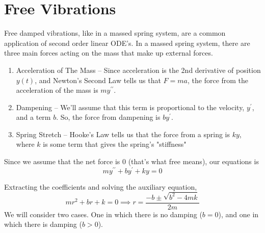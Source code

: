 \section{Free Vibrations}
\noindent
Free damped vibrations, like in a massed spring system, are a common application of second order linear ODE's. In a massed spring system, there are three main forces acting on the mass that make up external forces.
\begin{enumerate}[label=\arabic*)]
	\item Acceleration of The Mass -- Since acceleration is the 2nd derivative of position $y(t)$, and Newton's Second Law tells us that $F = ma$, the force from the acceleration of the mass is $my^{\prime\prime}$.
	\item Dampening -- We'll assume that this term is proportional to the velocity, $y^\prime$, and a term $b$. So, the force from dampening is $by^\prime$.
	\item Spring Stretch -- Hooke's Law tells us that the force from a spring is $ky$, where $k$ is some term that gives the spring's "stiffness"
\end{enumerate}
Since we assume that the net force is 0 (that's what free means), our equations is
\begin{equation*}
	my^{\prime\prime} + by^\prime + ky = 0
\end{equation*}

\noindent
Extracting the coefficients and solving the auxiliary equation,
\begin{equation*}
	mr^2 + br + k = 0 \implies r = \frac{-b \pm \sqrt{b^2 - 4mk}}{2m}
\end{equation*}
We will consider two cases. One in which there is no damping ($b = 0$), and one in which there is damping ($b > 0$).


